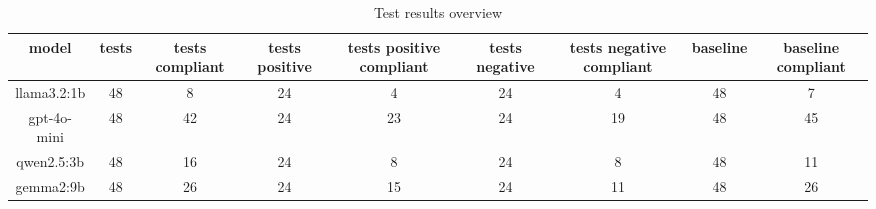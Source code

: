 
  \begin{table}[h!]
  \centering
  \begin{tabular}{|c|c|c|c|c|c|c|c|c|}
  \hline
  model & tests & tests compliant & tests positive & tests positive compliant & tests negative & tests negative compliant & baseline & baseline compliant \\
  \hline
  llama3.2:1b & 48 & 8 & 24 & 4 & 24 & 4 & 48 & 7\\
\hline
gpt-4o-mini & 48 & 42 & 24 & 23 & 24 & 19 & 48 & 45\\
\hline
qwen2.5:3b & 48 & 16 & 24 & 8 & 24 & 8 & 48 & 11\\
\hline
gemma2:9b & 48 & 26 & 24 & 15 & 24 & 11 & 48 & 26
  \end{tabular}
  \caption{Test results overview}
  
  \end{table}
  
